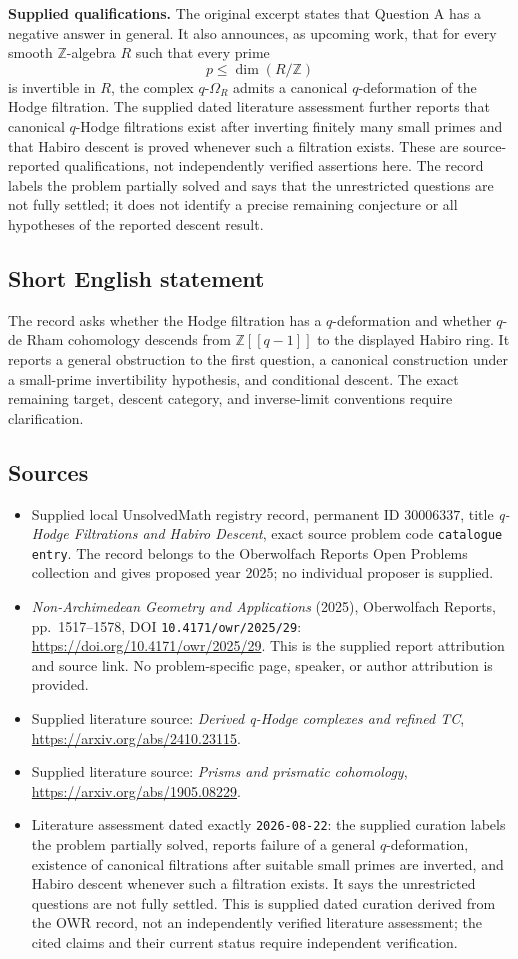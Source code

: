 \documentclass[11pt]{article}
\newcommand{\Z}{\mathbb{Z}}
\begin{document}
\textbf{Supplied qualifications.}
The original excerpt states that Question A has a negative answer in general. It also announces, as upcoming work, that for every smooth \(\Z\)-algebra \(R\) such that every prime
\[
p\leq\dim(R/\Z)
\]
is invertible in \(R\), the complex \(q\text{-}\Omega_R\) admits a canonical \(q\)-deformation of the Hodge filtration. The supplied dated literature assessment further reports that canonical \(q\)-Hodge filtrations exist after inverting finitely many small primes and that Habiro descent is proved whenever such a filtration exists. These are source-reported qualifications, not independently verified assertions here. The record labels the problem partially solved and says that the unrestricted questions are not fully settled; it does not identify a precise remaining conjecture or all hypotheses of the reported descent result.
\subsection{Short English statement}
The record asks whether the Hodge filtration has a \(q\)-deformation and whether \(q\)-de Rham cohomology descends from \(\Z[[q-1]]\) to the displayed Habiro ring. It reports a general obstruction to the first question, a canonical construction under a small-prime invertibility hypothesis, and conditional descent. The exact remaining target, descent category, and inverse-limit conventions require clarification.
\subsection{Sources}
\begin{itemize}
\item Supplied local UnsolvedMath registry record, permanent ID \(30006337\), title \emph{q-Hodge Filtrations and Habiro Descent}, exact source problem code \texttt{catalogue entry}. The record belongs to the Oberwolfach Reports Open Problems collection and gives proposed year 2025; no individual proposer is supplied.
\item \emph{Non-Archimedean Geometry and Applications} (2025), Oberwolfach Reports, pp.~1517--1578, DOI \texttt{10.4171/owr/2025/29}: \url{https://doi.org/10.4171/owr/2025/29}. This is the supplied report attribution and source link. No problem-specific page, speaker, or author attribution is provided.
\item Supplied literature source: \emph{Derived q-Hodge complexes and refined TC}, \url{https://arxiv.org/abs/2410.23115}.
\item Supplied literature source: \emph{Prisms and prismatic cohomology}, \url{https://arxiv.org/abs/1905.08229}.
\item Literature assessment dated exactly \texttt{2026-08-22}: the supplied curation labels the problem partially solved, reports failure of a general \(q\)-deformation, existence of canonical filtrations after suitable small primes are inverted, and Habiro descent whenever such a filtration exists. It says the unrestricted questions are not fully settled. This is supplied dated curation derived from the OWR record, not an independently verified literature assessment; the cited claims and their current status require independent verification.
\end{itemize}
\end{document}
